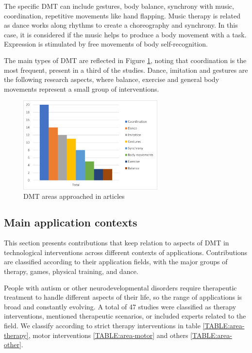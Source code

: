 \documentclass[a4paper,fleqn]{cas-sc}
\begin{document}
The specific DMT can include gestures, body balance, synchrony with music, coordination, repetitive movements like hand flapping. Music therapy is related as dance works along rhythms to create a choreography and synchrony. In this case, it is considered if the music helps to produce a body movement with a task. Expression is stimulated by free movements of body self-recognition.

The main types of DMT are reflected in Figure \ref{fig:DMT-types}, noting that coordination is the most frequent, present in a third of the studies. Dance, imitation and gestures are the following research aspects, where balance, exercise and general body movements represent a small group of interventions.

\begin{figure}
	\includegraphics[width=0.65\textwidth]{fig5_DMT-types.png}
        \centering
	  \caption{DMT areas approached in articles}
        \label{fig:DMT-types}
\end{figure}

\subsection{Main application contexts}
\label{sec:app-contexts}
This section presents contributions that keep relation to aspects of DMT in technological interventions across different contexts of applications. Contributions are classified according to their application fields, with the major groups of therapy, games, physical training, and dance.

People with autism or other neurodevelopmental disorders require therapeutic treatment to handle different aspects of their life, so the range of applications is broad and constantly evolving. A total of 47 studies were classified as therapy interventions, mentioned therapeutic scenarios, or included experts related to the field. We classify according to strict therapy interventions in table \ref{TABLE:area-therapy}, motor interventions \ref{TABLE:area-motor} and others \ref{TABLE:area-other}.
\end{document}
